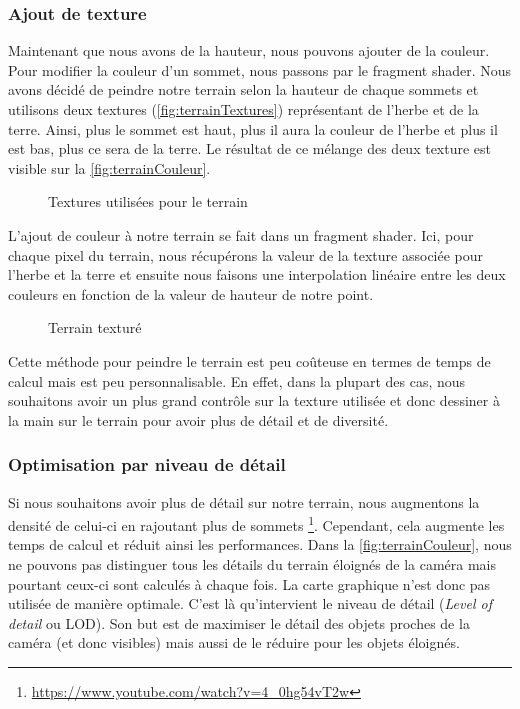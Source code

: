 \pagebreak
\subsubsection{Ajout de texture}

Maintenant que nous avons de la hauteur, nous pouvons ajouter de la couleur. Pour modifier la couleur d'un sommet, nous passons par le fragment shader. Nous avons décidé de peindre notre terrain selon la hauteur de chaque sommets et utilisons deux textures (\autoref{fig:terrainTextures}) représentant de l'herbe et de la terre. Ainsi, plus le sommet est haut, plus il aura la couleur de l'herbe et plus il est bas, plus ce sera de la terre. Le résultat de ce mélange des deux texture est visible sur la \autoref{fig:terrainCouleur}.
\begin{figure}[H]			
	
	\caption{Textures utilisées pour le terrain}
	\label{fig:terrainTextures}
\end{figure}

L'ajout de couleur à notre terrain se fait dans un fragment shader. Ici, pour chaque pixel du terrain, nous récupérons la valeur de la texture associée pour l'herbe et la terre et ensuite nous faisons une interpolation linéaire entre les deux couleurs en fonction de la valeur de hauteur de notre point.

\begin{figure}[H]			
	\caption{Terrain texturé}
	\label{fig:terrainCouleur}
\end{figure}

Cette méthode pour peindre le terrain est peu coûteuse en termes de temps de calcul mais est peu personnalisable. En effet, dans la plupart des cas, nous souhaitons avoir un plus grand contrôle sur la texture utilisée et donc dessiner à la main sur le terrain pour avoir plus de détail et de diversité.

\subsubsection{Optimisation par niveau de détail}

Si nous souhaitons avoir plus de détail sur notre terrain, nous augmentons la densité de celui-ci en rajoutant plus de sommets \footnote{\url{https://www.youtube.com/watch?v=4_0hg54vT2w}}. Cependant, cela augmente les temps de calcul et réduit ainsi les performances. Dans la \autoref{fig:terrainCouleur}, nous ne pouvons pas distinguer tous les détails du terrain éloignés de la caméra mais pourtant ceux-ci sont calculés à chaque fois. La carte graphique n'est donc pas utilisée de manière optimale. C'est là qu'intervient le niveau de détail (\textit{Level of detail} ou LOD). Son but est de maximiser le détail des objets proches de la caméra (et donc visibles) mais aussi de le réduire pour les objets éloignés. 








